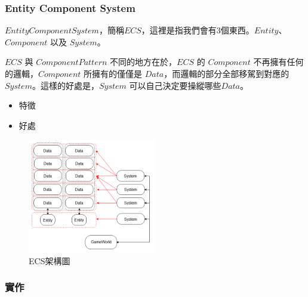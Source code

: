 \subsubsection{Entity Component System}

$Entity Component System$，簡稱$ECS$，這裡是指我們會有3個東西。$Entity$、 $Component$ 以及 $System$。

$ECS$ 與 $Component Pattern$ 不同的地方在於，$ECS$ 的 $Component$ 不再擁有任何的邏輯，$Component$ 所擁有的僅僅是 $Data$，而邏輯的部分全部移駕到對應的 $System$。這樣的好處是，$System$ 可以自己決定要操縱哪些$Data$。

\begin{itemize}
    \item{特徵}
    \item{好處} 
\end{itemize}

\begin{figure}[h]
    \begin{center}
        \includegraphics[width=0.5\textwidth]{./resources/ecs/ecs.png}
    \end{center}
\caption{ECS架構圖}
\label{fig:ecs}
\end{figure}

\subsubsection{實作}

